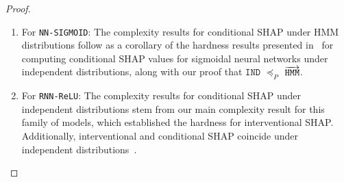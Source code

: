 \begin{proof}
\begin{enumerate}
\item For \texttt{NN-SIGMOID}: The complexity results for conditional SHAP under HMM distributions follow as a corollary of the hardness results presented in~\citep{vander21} for computing conditional SHAP values for sigmoidal neural networks under independent distributions, along with our proof that $\texttt{IND}$ $\preceq_{P}$ $\overrightarrow{\texttt{HMM}}$.
\item For \texttt{RNN-ReLU}: The complexity results for conditional SHAP under independent distributions stem from our main complexity result for this family of models, which established the hardness for interventional SHAP. Additionally, interventional and conditional SHAP coincide under independent distributions~\citep{sundararajan20b}.








\end{enumerate}
\end{proof}
